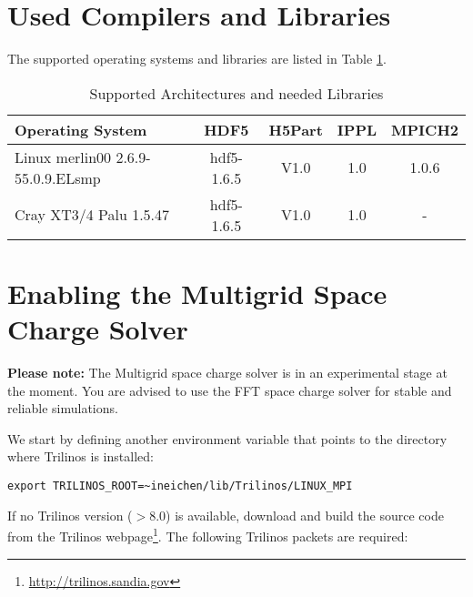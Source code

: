 \clearpage
\section{Used Compilers and Libraries}
The supported operating systems and libraries are listed in Table \ref{tab:archlib}.
\begin{table}[Ht]
  \caption{Supported Architectures and needed Libraries}
  \label{tab:archlib}
  \begin{center}
    \begin{tabular}{|lcccc|}
      \hline
      Operating System & HDF5  & H5Part & IPPL & MPICH2\\
      \hline
      Linux merlin00 2.6.9-55.0.9.ELsmp & hdf5-1.6.5 & V1.0 & 1.0 & 1.0.6 \\
      Cray XT3/4 Palu 1.5.47 & hdf5-1.6.5 & V1.0 & 1.0 & - \\
      \hline
    \end{tabular}
  \end{center}
\end{table}

\section{Enabling the Multigrid Space Charge Solver}

{\bf Please note:} The Multigrid space charge solver is in an experimental stage at the moment. You are advised to use the FFT space charge solver for stable and reliable simulations.

We start by defining another environment variable that points to the directory where Trilinos is installed:
\begin{verbatim}
export TRILINOS_ROOT=~ineichen/lib/Trilinos/LINUX_MPI
\end{verbatim}
If no Trilinos version ($>$8.0) is available, download and build the source code from the Trilinos webpage\footnote{\url{http://trilinos.sandia.gov}}. The following Trilinos packets are required:

